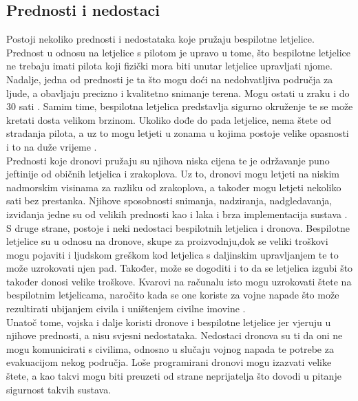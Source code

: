 \documentclass[times, utf8, diplomski]{fer}
\begin{document}
\subsection{Prednosti i nedostaci}
Postoji nekoliko prednosti i nedostataka koje pružaju bespilotne letjelice. Prednost u odnosu na letjelice s pilotom je upravo u tome, što bespilotne letjelice ne trebaju imati pilota 
koji fizički  mora  biti  unutar  letjelice  upravljati  njome.  Nadalje, jedna od prednosti je ta što mogu doći na nedohvatljiva područja za ljude, a obavljaju precizno i kvalitetno snimanje terena. Mogu ostati u zraku i do 30 sati \citep{AdvantagesofUAS}. Samim time, bespilotna letjelica predstavlja sigurno okruženje te se može kretati dosta velikom brzinom. Ukoliko dođe do pada letjelice, nema štete od stradanja pilota, a uz to mogu letjeti u zonama u kojima postoje velike opasnosti i to na duže vrijeme \citep{Soffar}. \\
Prednosti koje dronovi pružaju su njihova niska cijena te je održavanje puno jeftinije od običnih letjelica i zrakoplova. Uz to, dronovi mogu letjeti na niskim nadmorskim visinama za razliku od zrakoplova, a također mogu letjeti nekoliko sati bez prestanka. Njihove sposobnosti snimanja, nadziranja, nadgledavanja, izviđanja jedne su od velikih prednosti kao i laka i brza implementacija sustava \citep{PhilForHumanity}.\\
S  druge  strane,  postoje  i  neki  nedostaci  bespilotnih  letjelica  i  dronova. Bespilotne letjelice su u odnosu na dronove, skupe za proizvodnju,dok se veliki troškovi mogu pojaviti i ljudskom greškom kod letjelica s daljinskim upravljanjem te to može uzrokovati njen pad. Također, može se dogoditi i to da se letjelica izgubi što također donosi velike troškove. Kvarovi na računalu isto mogu uzrokovati štete na bespilotnim letjelicama, naročito kada se one koriste za vojne napade što može rezultirati ubijanjem civila i uništenjem  civilne  imovine \citep{Soffar}. \\
Unatoč tome, vojska i dalje koristi dronove i  bespilotne letjelice jer vjeruju u njihove prednosti, a nisu svjesni nedostataka. Nedostaci dronova su ti da oni ne mogu komunicirati s civilima, odnosno u slučaju vojnog napada te potrebe za evakuacijom nekog područja. Loše programirani dronovi mogu izazvati velike štete, a kao takvi mogu biti preuzeti od strane neprijatelja što dovodi u pitanje sigurnost takvih sustava. 


 
\end{document}

